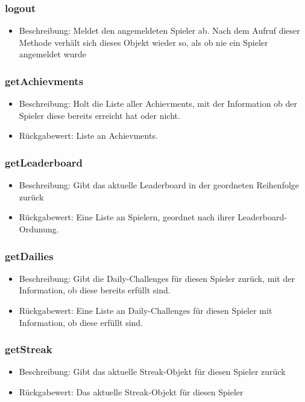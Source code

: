 \documentclass[a4paper]{scrreprt}
\begin{document}
	\subsubsection{logout}
	\begin{itemize}
		\item Beschreibung: Meldet den angemeldeten Spieler ab. Nach dem Aufruf dieser Methode verhält sich dieses Objekt wieder so, als ob nie ein Spieler angemeldet wurde
	\end{itemize}
	\subsubsection{getAchievments}
	\begin{itemize}
		\item Beschreibung: Holt die Liste aller Achievments, mit der Information ob der Spieler diese bereits erreicht hat oder nicht.
		\item Rückgabewert: Liste an Achievments. 
	\end{itemize}
	\subsubsection{getLeaderboard}
	\begin{itemize}
		\item Beschreibung: Gibt das aktuelle Leaderboard in der geordneten Reihenfolge zurück
		\item Rückgabewert: Eine Liste an Spielern, geordnet nach ihrer Leaderboard-Ordunung. 
	\end{itemize}
	\subsubsection{getDailies}
	\begin{itemize}
		\item Beschreibung: Gibt die Daily-Challenges für diesen Spieler zurück, mit der Information, ob diese bereits erfüllt sind.
		\item Rückgabewert: Eine Liste an Daily-Challenges für diesen Spieler mit Information, ob diese erfüllt sind.
	\end{itemize}
	\subsubsection{getStreak}
	\begin{itemize}
		\item Beschreibung: Gibt das aktuelle Streak-Objekt für diesen Spieler zurück
		\item Rückgabewert: Das aktuelle Streak-Objekt für diesen Spieler 
	\end{itemize}
\end{document}
